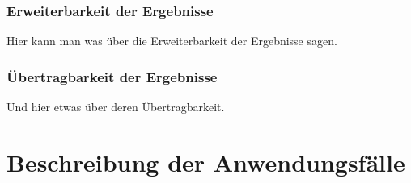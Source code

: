 \documentclass[oneside]{ausarbeitung}
\begin{document}
\subsection{Erweiterbarkeit der Ergebnisse}
\label{sub:erweiterbarkeit}

Hier kann man was über die Erweiterbarkeit der Ergebnisse sagen.

\subsection{Übertragbarkeit der Ergebnisse}
\label{sub:uebertragbarkeit}

Und hier etwas über deren Übertragbarkeit.

\appendix

\printbibliography[heading=bibintoc]

\chapter{Beschreibung der Anwendungsfälle}
\label{appendix:use-cases}
\end{document}
